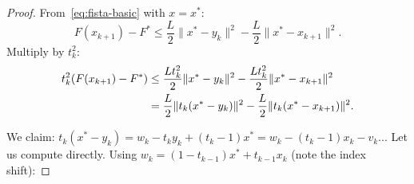 \documentclass[11pt,a4paper]{article}
\begin{document}
\begin{proof}
From~\eqref{eq:fista-basic} with $x = x^*$:
\begin{equation}\label{eq:base-ineq}
  F(x_{k+1}) - F^* \le \frac{L}{2}\|x^* - y_k\|^2
  - \frac{L}{2}\|x^* - x_{k+1}\|^2.
\end{equation}
Multiply by $t_k^2$:
\begin{align}
  t_k^2(F(x_{k+1}) - F^*)
  &\le \frac{Lt_k^2}{2}\|x^* - y_k\|^2
  - \frac{Lt_k^2}{2}\|x^* - x_{k+1}\|^2 \notag \\
  &= \frac{L}{2}\|t_k(x^* - y_k)\|^2
  - \frac{L}{2}\|t_k(x^* - x_{k+1})\|^2. \label{eq:scaled-ineq}
\end{align}

We claim: $t_k(x^* - y_k) = w_k - t_k y_k + (t_k - 1)x^*
= w_k - (t_k - 1)x_k - v_k$... Let us compute directly.
Using $w_k = (1 - t_{k-1})x^* + t_{k-1}x_k$ (note the index shift):


\end{proof}
\end{document}
